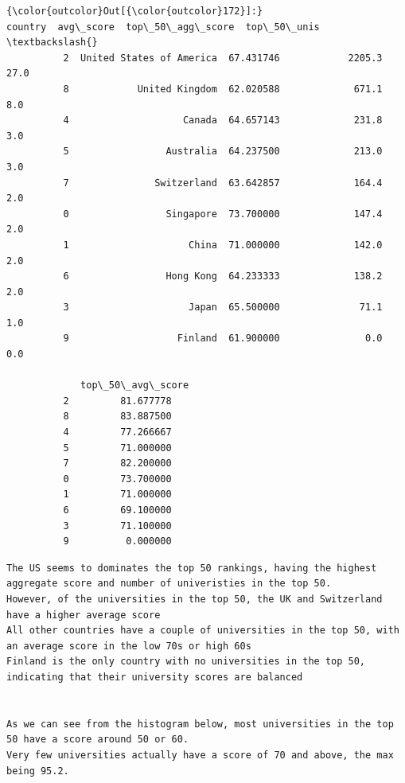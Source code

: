 \documentclass[11pt]{article}
\begin{document}
\begin{Verbatim}[commandchars=\\\{\}]
{\color{outcolor}Out[{\color{outcolor}172}]:}                     country  avg\_score  top\_50\_agg\_score  top\_50\_unis  \textbackslash{}
          2  United States of America  67.431746            2205.3         27.0   
          8            United Kingdom  62.020588             671.1          8.0   
          4                    Canada  64.657143             231.8          3.0   
          5                 Australia  64.237500             213.0          3.0   
          7               Switzerland  63.642857             164.4          2.0   
          0                 Singapore  73.700000             147.4          2.0   
          1                     China  71.000000             142.0          2.0   
          6                 Hong Kong  64.233333             138.2          2.0   
          3                     Japan  65.500000              71.1          1.0   
          9                   Finland  61.900000               0.0          0.0   
          
             top\_50\_avg\_score  
          2         81.677778  
          8         83.887500  
          4         77.266667  
          5         71.000000  
          7         82.200000  
          0         73.700000  
          1         71.000000  
          6         69.100000  
          3         71.100000  
          9          0.000000  
\end{Verbatim}
            
    \begin{Verbatim}[commandchars=\\\{\}]
The US seems to dominates the top 50 rankings, having the highest aggregate score and number of univeristies in the top 50.
However, of the universities in the top 50, the UK and Switzerland have a higher average score
All other countries have a couple of universities in the top 50, with an average score in the low 70s or high 60s
Finland is the only country with no universities in the top 50, indicating that their university scores are balanced


As we can see from the histogram below, most universities in the top 50 have a score around 50 or 60.
Very few universities actually have a score of 70 and above, the max being 95.2.

    \end{Verbatim}

    \begin{center}
    \end{center}
    { \hspace*{\fill} \\}
    
\end{document}
